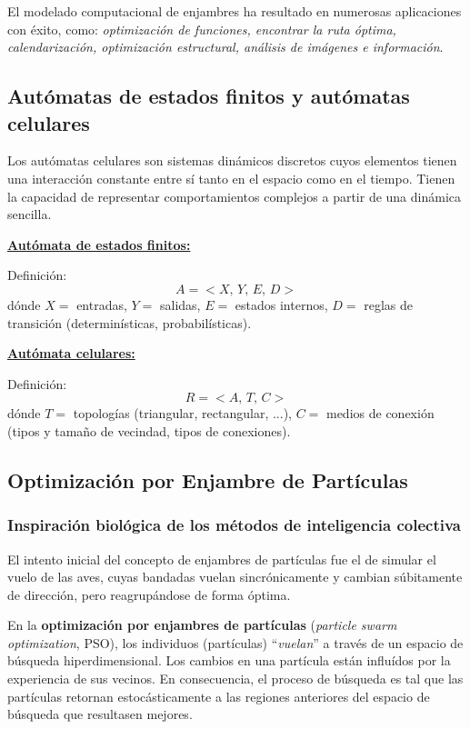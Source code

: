 \documentclass[10pt,a4paper]{article}
\begin{document}
El modelado computacional de enjambres ha resultado en numerosas aplicaciones con éxito, como: \textit{optimización de funciones, encontrar la ruta óptima, calendarización, optimización estructural, análisis de imágenes e información}.

\subsection{Autómatas de estados finitos y autómatas celulares}

Los autómatas celulares son sistemas dinámicos discretos cuyos elementos tienen una interacción constante entre sí tanto en el espacio como en el tiempo.  Tienen la capacidad de representar comportamientos complejos a partir de una dinámica sencilla. 

\begin{multicols}{2}
\underline{\textbf{Autómata de estados finitos:}}

Definición: 
\[
A = < X,\,Y,\,E,\,D >
\]
dónde $X=$ entradas, $Y=$ salidas, $E=$ estados internos, $D=$ reglas de transición (determinísticas, probabilísticas).

\columnbreak

\underline{\textbf{Autómata celulares:}}

Definición: 
\[
R = < A,\,T,\,C >
\]
dónde $T=$ topologías (triangular, rectangular, ...), $C=$ medios de conexión (tipos y tamaño de vecindad, tipos de conexiones).
\end{multicols}

\subsection{Optimización por Enjambre de Partículas}

\subsubsection{Inspiración biológica de los métodos de inteligencia colectiva}

El intento inicial del concepto de enjambres de partículas fue el de simular el vuelo de las aves, cuyas bandadas vuelan sincrónicamente y cambian súbitamente de dirección, pero reagrupándose de forma óptima.

En la \textbf{optimización por enjambres de partículas} (\textit{particle swarm optimization}, PSO), los individuos (partículas) ``\textit{vuelan}'' a través de un espacio de búsqueda hiperdimensional. Los cambios en una partícula están influídos por la experiencia de sus vecinos. En consecuencia, el proceso de búsqueda es tal que las partículas retornan estocásticamente a las regiones anteriores del espacio de búsqueda que resultasen mejores.
\end{document}
